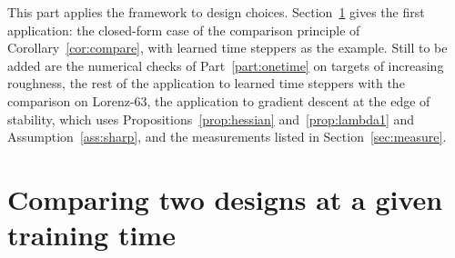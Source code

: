 \documentclass[11pt]{article}
\theoremstyle{definition}
\theoremstyle{remark}
\begin{document}

This part applies the framework to design choices.
Section~\ref{sec:designcompare} gives the first application: the closed-form case of the comparison principle of Corollary~\ref{cor:compare}, with learned time steppers as the example.
Still to be added are the numerical checks of Part~\ref{part:onetime} on targets of increasing roughness, the rest of the application to learned time steppers with the comparison on Lorenz-63, the application to gradient descent at the edge of stability, which uses Propositions~\ref{prop:hessian} and~\ref{prop:lambda1} and Assumption~\ref{ass:sharp}, and the measurements listed in Section~\ref{sec:measure}.

\section{Comparing two designs at a given training time}\label{sec:designcompare}
\end{document}
